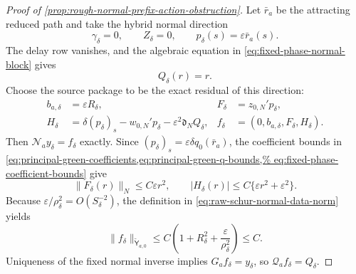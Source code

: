 \begin{proof}[Proof of
\cref{prop:rough-normal-prefix-action-obstruction}]
Let \(\bar r_a\) be the attracting reduced path and take the hybrid normal
direction
\begin{equation}
 \gamma_\delta=0,\qquad Z_\delta=0,\qquad
 p_\delta(s)=\varepsilon\bar r_a(s).              \label{eq:proof-rough-action-test-direction}
\end{equation}
The delay row vanishes, and the algebraic equation in
\cref{eq:fixed-phase-normal-block} gives
\begin{equation}
 Q_\delta(r)=r.                                   \label{eq:proof-rough-action-test-speed}
\end{equation}
Choose the source package to be the exact residual of this direction:
\begin{align}
 b_{a,\delta}&=\varepsilon R_\delta,
 &F_\delta&=z_{0,N}'p_\delta,\\
 H_\delta&=\delta(p_\delta)_s-w_{0,N}'p_\delta
             -\varepsilon^2\mathfrak d_NQ_\delta,
 &f_\delta&=(0,b_{a,\delta},F_\delta,H_\delta).
                                                        \label{eq:proof-rough-action-test-data}
\end{align}
Then \(\mathscr N_ay_\delta=f_\delta\) exactly.  Since
\((p_\delta)_s=\varepsilon\delta q_0(\bar r_a)\), the coefficient bounds
in \cref{eq:principal-green-coefficients,eq:principal-green-q-bounds,%
eq:fixed-phase-coefficient-bounds}
give
\begin{equation*}
 \|F_\delta(r)\|_N\le C\varepsilon r^2,\qquad
 |H_\delta(r)|\le C\{\varepsilon r^2+\varepsilon^2\}.
\end{equation*}
Because \(\varepsilon/\rho_\delta^2=O(S_\delta^{-2})\), the definition
in \cref{eq:raw-schur-normal-data-norm} yields
\begin{equation}
 \|f_\delta\|_{\widetilde{\mathsf Y}_{a,0}}
 \le C\left(1+R_\delta^2+\frac{\varepsilon}{\rho_\delta^2}\right)
 \le C.                                          \label{eq:proof-rough-action-old-data-bound}
\end{equation}
Uniqueness of the fixed normal inverse implies
\(G_af_\delta=y_\delta\), so
\(\mathscr Q_af_\delta=Q_\delta\).


\end{proof}
